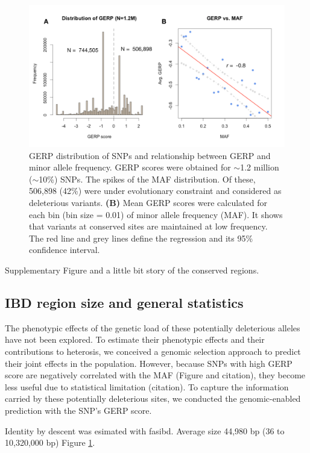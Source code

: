 \documentclass[9pt,twocolumn,twoside]{gsajnl}
\begin{document}
\begin{figure}[htbp]
\centering
\includegraphics[width=\linewidth]{gerp.pdf}
\caption{GERP distribution of SNPs and relationship between GERP and minor allele frequency. GERP scores were obtained for $\sim$1.2 million ($\sim$10\%) SNPs. The spikes of the MAF distribution. Of these, 506,898 (42\%) were under evolutionary constraint and considered as deleterious variants. 
\textbf{(B)} Mean GERP scores were calculated for each bin (bin size = 0.01) of minor allele frequency (MAF). It shows that variants at conserved sites are maintained at low frequency. The red line and grey lines define the regression and its 95\% confidence interval.}
\label{fig:gerp}
\end{figure}


Supplementary Figure and a little bit story of the conserved regions.


\subsection*{IBD region size and general statistics}

The phenotypic effects of the genetic load of these potentially deleterious alleles have not been explored. To estimate their phenotypic effects and their contributions to heterosis, we conceived a genomic selection approach to predict their joint effects in the population. However, because SNPs with high GERP score are negatively correlated with the MAF (Figure and citation), they become less useful due to statistical limitation (citation). To capture the information carried by these potentially deleterious sites, we conducted the genomic-enabled prediction with the SNP's GERP score. 

Identity by descent was esimated with fasibd.
Average size 44,980 bp (36 to 10,320,000 bp)
Figure \ref{fig:gerp}.
\end{document}
